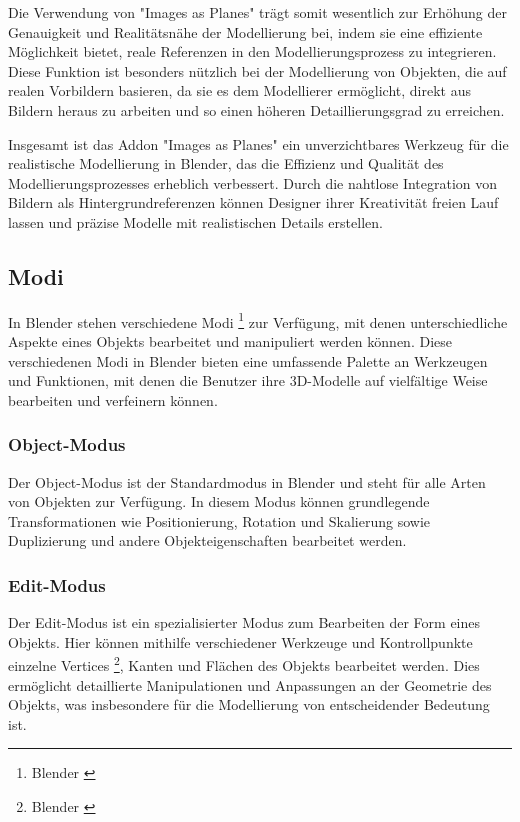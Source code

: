 Die Verwendung von "Images as Planes" trägt somit wesentlich zur Erhöhung der Genauigkeit und Realitätsnähe der
Modellierung bei, indem sie eine effiziente Möglichkeit bietet, reale Referenzen in den Modellierungsprozess zu integrieren.
Diese Funktion ist besonders nützlich bei der Modellierung von Objekten, die auf realen Vorbildern basieren, da sie es
dem Modellierer ermöglicht, direkt aus Bildern heraus zu arbeiten und so einen höheren Detaillierungsgrad zu erreichen.

Insgesamt ist das Addon "Images as Planes" ein unverzichtbares Werkzeug für die realistische Modellierung in Blender,
das die Effizienz und Qualität des Modellierungsprozesses erheblich verbessert. Durch die nahtlose Integration von Bildern
als Hintergrundreferenzen können Designer ihrer Kreativität freien Lauf lassen und präzise Modelle mit realistischen
Details erstellen.

\subsection{Modi}
In Blender stehen verschiedene Modi \footnote{Blender \cite{Modi}} zur Verfügung, mit denen unterschiedliche Aspekte
eines Objekts bearbeitet und manipuliert werden können. Diese verschiedenen Modi in Blender bieten eine umfassende Palette
an Werkzeugen und Funktionen, mit denen die Benutzer ihre 3D-Modelle auf vielfältige Weise bearbeiten und verfeinern können.

\subsubsection{Object-Modus}
Der Object-Modus ist der Standardmodus in Blender und steht für alle Arten von Objekten zur Verfügung. In diesem Modus
können grundlegende Transformationen wie Positionierung, Rotation und Skalierung sowie Duplizierung und andere
Objekteigenschaften bearbeitet werden.

\subsubsection{Edit-Modus}
Der Edit-Modus ist ein spezialisierter Modus zum Bearbeiten der Form eines Objekts. Hier können mithilfe verschiedener
Werkzeuge und Kontrollpunkte einzelne Vertices \footnote{Blender \cite{Vertices}}, Kanten und Flächen des Objekts
bearbeitet werden. Dies ermöglicht detaillierte Manipulationen und Anpassungen an der Geometrie des Objekts, was
insbesondere für die Modellierung von entscheidender Bedeutung ist.

